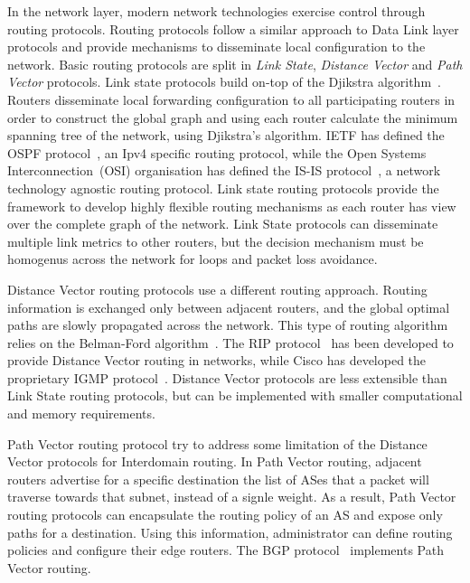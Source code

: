 In the network layer, modern network technologies exercise control through
routing protocols. Routing protocols follow a similar approach to Data Link
layer protocols and provide mechanisms to disseminate local configuration to the
network. Basic routing protocols are split in {\it Link State}, {\it Distance
  Vector} and {\it Path Vector} protocols. Link state protocols build on-top of
the Djikstra algorithm~\cite{Djikstra1959}. Routers disseminate local
forwarding configuration to all participating routers in order to construct the
global graph and using each router calculate the minimum
spanning tree of the network, using Djikstra's algorithm.  IETF has defined the
OSPF protocol~\cite{2328}, an Ipv4 specific routing protocol, while the
Open Systems Interconnection~(OSI)
organisation has defined the IS-IS protocol~\cite{RFC1142}, a network technology
agnostic routing protocol.
Link state routing protocols provide the framework to develop highly flexible
routing mechanisms as each router has view over the complete graph of the
network. Link State protocols can disseminate multiple
link metrics to other routers, but the decision mechanism must be
homogenus across the network for loops and packet loss avoidance.

Distance Vector routing protocols use a different routing approach. Routing
information is exchanged only between adjacent routers, and the global optimal
paths are slowly propagated across the network. This type of routing algorithm
relies on the Belman-Ford algorithm~\cite{bellman1956}. The RIP
protocol~\cite{RFC2453} has been developed to provide Distance Vector routing in
networks, while Cisco has developed the proprietary IGMP
protocol~\cite{Rutgers1991}. Distance Vector protocols are less extensible than
Link State routing protocols, but can be implemented with smaller computational and
memory requirements.

Path Vector routing protocol try to address some limitation of the Distance
Vector protocols for Interdomain routing. In Path Vector routing, adjacent
routers advertise for a specific destination the list of ASes that a packet will
traverse towards that subnet, instead of a signle weight. As a result, Path
Vector routing protocols can encapsulate the routing policy of an AS and expose
only paths for a destination. Using this information, administrator can define
routing policies and configure their edge routers. The BGP
protocol~\cite{RFC1265} implements Path Vector routing.

